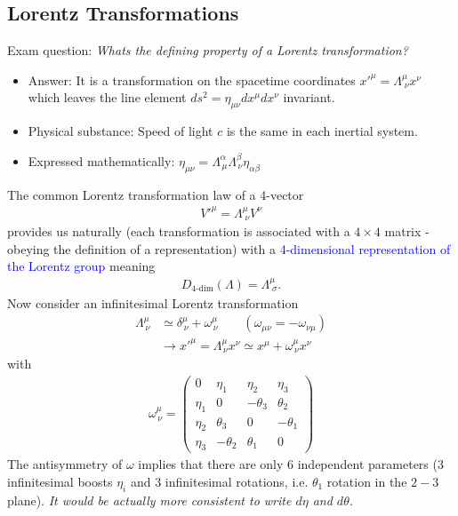 \documentclass[10pt,a4paper]{report}
\theoremstyle{definition}
\begin{document}
\subsection{Lorentz Transformations}
Exam question: {\it Whats the defining property of a Lorentz transformation?}
\begin{itemize}
\item Answer: It is a transformation on the spacetime coordinates $x'^\mu=\Lambda^\mu_{\;\nu}x^\nu$ which leaves the line element $ds^2=\eta_{\mu\nu}dx^\mu dx^\nu$ invariant.
\item Physical substance: Speed of light $c$ is the same in each inertial system.
\item Expressed mathematically:
$\eta_{\mu\nu}=\Lambda^\alpha_{\,\mu}\Lambda^\beta_{\,\nu}\eta_{\alpha\beta}$
\end{itemize}
The common Lorentz transformation law of a 4-vector
\begin{align}
V'^\mu=\Lambda^\mu_{\;\nu}V^\nu
\end{align}
provides us naturally (each transformation is associated with a $4\times4$ matrix - obeying the definition of a representation) with a \textcolor{blue}{4-dimensional representation of the Lorentz group} meaning
\begin{align}
D_\text{4-dim}(\Lambda)=\Lambda^\mu_{\;\sigma}.
\end{align}
Now consider an infinitesimal Lorentz transformation 
\begin{align}
\Lambda^\mu_{\,\nu}
&\simeq\delta^\mu_{\,\nu}+\omega^\mu_{\,\nu}\qquad(\omega_{\mu\nu}=-\omega_{\nu\mu})\\
&\rightarrow x'^\mu
=\Lambda^\mu_{\,\nu}x^\nu\simeq x^\mu+\omega^\mu_{\,\nu}x^\nu
\end{align}
with
\begin{align}
\omega^\mu_{\,\nu}=\left(
\begin{array}{cccc}
0      &  \eta_1 &  \eta_2 &  \eta_3\\
\eta_1 &  0   & -\theta_3 &  \theta_2\\
\eta_2 &  \theta_3 &  0   & -\theta_1\\
\eta_3 & -\theta_2 &  \theta_1 &  0
\end{array}
\right)
\end{align}
The antisymmetry of $\omega$ implies that there are only 6 independent parameters (3 infinitesimal boosts $\eta_i$ and 3 infinitesimal rotations, i.e. $\theta_1$ rotation in the $2-3$ plane). {\it It would be actually more consistent to write $d\eta$ and $d\theta$.}
\end{document}
